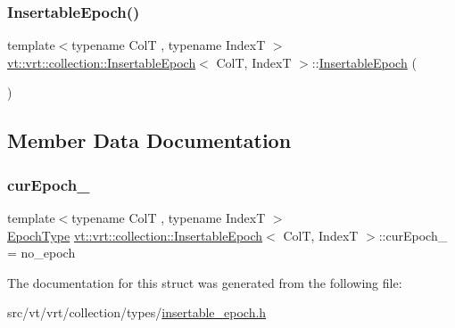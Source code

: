 \subsubsection{\texorpdfstring{Insertable\+Epoch()}{InsertableEpoch()}}
{\footnotesize\ttfamily template$<$typename ColT , typename IndexT $>$ \\
\hyperlink{structvt_1_1vrt_1_1collection_1_1_insertable_epoch}{vt\+::vrt\+::collection\+::\+Insertable\+Epoch}$<$ ColT, IndexT $>$\+::\hyperlink{structvt_1_1vrt_1_1collection_1_1_insertable_epoch}{Insertable\+Epoch} (\begin{DoxyParamCaption}{ }\end{DoxyParamCaption})\hspace{0.3cm}{\ttfamily [inline]}}



\subsection{Member Data Documentation}
\mbox{\label{structvt_1_1vrt_1_1collection_1_1_insertable_epoch_acaadf611bda2cb1cd810efdac251057d}} 
\subsubsection{\texorpdfstring{cur\+Epoch\+\_\+}{curEpoch\_}}
{\footnotesize\ttfamily template$<$typename ColT , typename IndexT $>$ \\
\hyperlink{namespacevt_a985a5adf291c34a3ca263b3378388236}{Epoch\+Type} \hyperlink{structvt_1_1vrt_1_1collection_1_1_insertable_epoch}{vt\+::vrt\+::collection\+::\+Insertable\+Epoch}$<$ ColT, IndexT $>$\+::cur\+Epoch\+\_\+ = no\+\_\+epoch\hspace{0.3cm}{\ttfamily [protected]}}



The documentation for this struct was generated from the following file\+:\begin{DoxyCompactItemize}
\item 
src/vt/vrt/collection/types/\hyperlink{insertable__epoch_8h}{insertable\+\_\+epoch.\+h}\end{DoxyCompactItemize}
